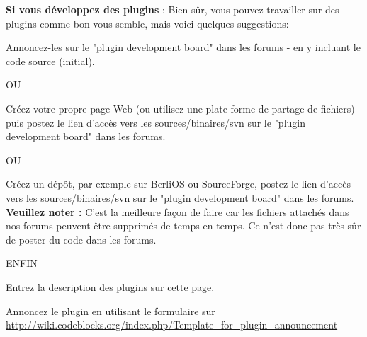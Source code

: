 \textbf{Si vous développez des plugins} : Bien sûr, vous pouvez travailler sur des plugins comme bon vous semble, mais voici quelques suggestions:

\tab Annoncez-les sur le "plugin development board" dans les forums - en y incluant le code source (initial).

OU

\tab Créez votre propre page Web (ou utilisez une plate-forme de partage de fichiers) puis postez le lien d'accès vers les sources/binaires/svn sur le "plugin development board" dans les forums.

OU

\tab Créez un dépôt, par exemple sur BerliOS ou SourceForge, postez le lien d'accès vers les sources/binaires/svn sur le "plugin development board" dans les forums. \textbf{Veuillez noter :} C'est la meilleure façon de faire car les fichiers attachés dans nos forums peuvent être supprimés de temps en temps. Ce n'est donc pas très sûr de poster du code dans les forums.

ENFIN

\tab Entrez la description des plugins sur cette page.

\tab Annoncez le plugin en utilisant le formulaire sur \url{http://wiki.codeblocks.org/index.php/Template_for_plugin_announcement}

\begin{ASTYLE}

\end{ASTYLE}

\begin{AUTOVERSIONING}

\end{AUTOVERSIONING}

\begin{BROWSETRACKS}

\end{BROWSETRACKS}

\begin{CODESNIPPETS}

\end{CODESNIPPETS}

\begin{DOXYBLOCKS}

\end{DOXYBLOCKS}

\begin{EDITORTWEAKS}

\end{EDITORTWEAKS}

\begin{FILEMANAGER}

\end{FILEMANAGER}

